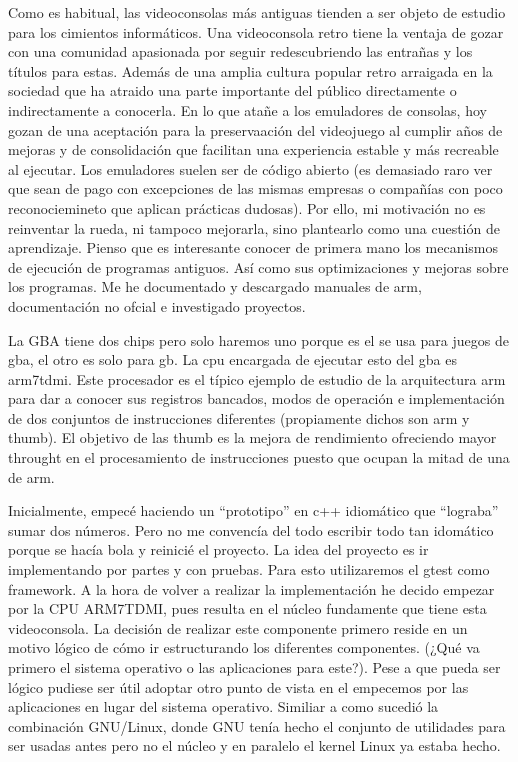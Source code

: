Como es habitual, las videoconsolas más antiguas tienden a ser objeto de estudio para los cimientos informáticos. Una videoconsola retro tiene la ventaja de gozar con una comunidad apasionada por seguir redescubriendo las entrañas y los títulos para estas. Además de una amplia cultura popular retro arraigada en la sociedad que ha atraido una parte importante del público directamente o indirectamente a conocerla. En lo que atañe a los emuladores de consolas, hoy gozan de una aceptación para la preservaación del videojuego al cumplir años de mejoras y de consolidación que facilitan una experiencia estable y más recreable al ejecutar. Los emuladores suelen ser de código abierto (es demasiado raro ver que sean de pago con excepciones de las mismas empresas o compañías con poco reconociemineto que aplican prácticas dudosas). Por ello, mi motivación no es reinventar la rueda, ni tampoco mejorarla, sino plantearlo como una cuestión de aprendizaje. Pienso que es interesante conocer de primera mano los mecanismos de ejecución de programas antiguos. Así como sus optimizaciones y mejoras sobre los programas. Me he documentado y descargado manuales de arm, documentación no ofcial e investigado proyectos.

La GBA tiene dos chips pero solo haremos uno porque es el se usa para juegos de gba, el otro es solo para gb. La cpu encargada de ejecutar esto del gba es arm7tdmi. Este procesador es el típico ejemplo de estudio de la arquitectura arm para dar a conocer sus registros bancados, modos de operación e implementación de dos conjuntos de instrucciones diferentes (propiamente dichos son arm y thumb). El objetivo de las thumb es la mejora de rendimiento ofreciendo mayor throught en el procesamiento de instrucciones puesto que ocupan la mitad de una de arm.

Inicialmente, empecé haciendo un \enquote{prototipo} en c++ idiomático que \enquote{lograba} sumar dos números. Pero no me convencía del todo escribir todo tan idomático porque se hacía bola y reinicié el proyecto. La idea del proyecto es ir implementando por partes y con pruebas. Para esto utilizaremos el gtest como framework. A la hora de volver a realizar la implementación he decido empezar por la CPU ARM7TDMI, pues resulta en el núcleo fundamente que tiene esta videoconsola. La decisión de realizar este componente primero reside en un motivo lógico de cómo ir estructurando los diferentes componentes. (¿Qué va primero el sistema operativo o las aplicaciones para este?). Pese a que pueda ser lógico pudiese ser útil adoptar otro punto de vista en el empecemos por las aplicaciones en lugar del sistema operativo. Similiar a como sucedió la combinación GNU/Linux, donde GNU tenía hecho el conjunto de utilidades para ser usadas antes pero no el núcleo y en paralelo el kernel Linux ya estaba hecho.  

